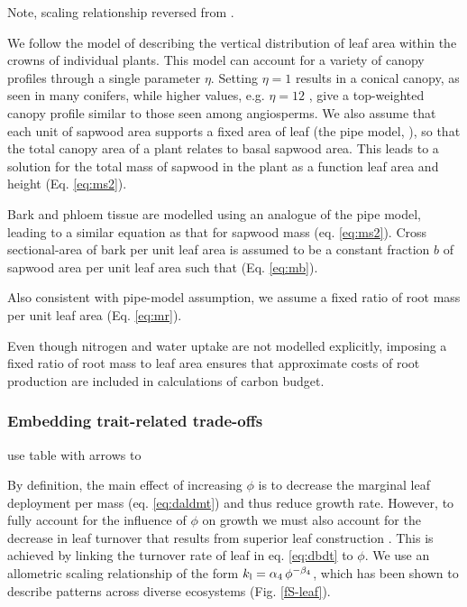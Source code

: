 \documentclass[a4paper,11pt]{article}
\begin{document}
Note, scaling relationship reversed from \citep{Falster-2011}.

We follow the model of \citep{Yokozawa-1995} describing the
vertical distribution of leaf area within the crowns of individual
plants. This model can account for a variety of canopy profiles through
a single parameter $\eta$. Setting $\eta=1$ results in a conical
canopy, as seen in many conifers, while higher values, e.g. $\eta=12$
, give a top-weighted canopy profile similar to those seen among
angiosperms. We also assume that each unit of sapwood area supports a fixed area of
leaf (the pipe model, \citep{Shinozaki-1964}), so that the total
canopy area of a plant relates to basal sapwood area. This leads to a solution for the total mass of sapwood in the plant as a function leaf area and height (Eq. \ref{eq:ms2}).

Bark and phloem tissue are modelled using an analogue of the pipe model,
leading to a similar equation as that for sapwood mass (eq.
\ref{eq:ms2}). Cross sectional-area of bark per unit leaf area is
assumed to be a constant fraction $b$ of sapwood area per unit leaf
area such that (Eq. \ref{eq:mb}).

Also consistent with pipe-model assumption, we assume a fixed ratio of
root mass per unit leaf area (Eq. \ref{eq:mr}).

Even though nitrogen and water uptake are not modelled explicitly,
imposing a fixed ratio of root mass to leaf area ensures that
approximate costs of root production are included in calculations of
carbon budget.

\subsubsection{Embedding trait-related trade-offs}

use table with arrows to



By definition, the main effect of increasing $\phi$ is to decrease the
marginal leaf deployment per mass (eq. \ref{eq:daldmt}) and thus reduce
growth rate. However, to fully account for the influence of $\phi$ on
growth we must also account for the decrease in leaf turnover that
results from superior leaf construction \citep{Wright-2004}.
This is achieved by linking the turnover rate of leaf in eq.
\ref{eq:dbdt} to $\phi$. We use an allometric scaling relationship of
the form $k_{\rm l}=\alpha_4 \, \phi^{-\beta_4}$, which has been
shown to describe patterns across diverse
ecosystems \citep{Wright-2004} (Fig. \ref{fS-leaf}).
\end{document}

